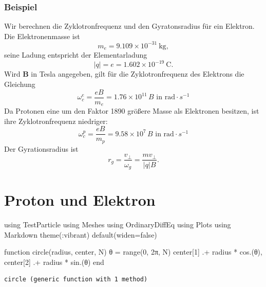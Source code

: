 \documentclass[
  a4paper,
  DIV=11]{scrreprt}
\newenvironment{Shaded}{\begin{snugshade}}{\end{snugshade}}
\newcommand{\BuiltInTok}[1]{\textcolor[rgb]{0.00,0.23,0.31}{#1}}
\newcommand{\ConstantTok}[1]{\textcolor[rgb]{0.56,0.35,0.01}{#1}}
\newcommand{\FloatTok}[1]{\textcolor[rgb]{0.68,0.00,0.00}{#1}}
\newcommand{\FunctionTok}[1]{\textcolor[rgb]{0.28,0.35,0.67}{#1}}
\newcommand{\ImportTok}[1]{\textcolor[rgb]{0.00,0.46,0.62}{#1}}
\newcommand{\KeywordTok}[1]{\textcolor[rgb]{0.00,0.23,0.31}{#1}}
\newcommand{\NormalTok}[1]{\textcolor[rgb]{0.00,0.23,0.31}{#1}}
\newcommand{\OperatorTok}[1]{\textcolor[rgb]{0.37,0.37,0.37}{#1}}
\begin{document}
\hypertarget{beispiel-1}{%
\subsection{Beispiel}\label{beispiel-1}}

Wir berechnen die Zyklotronfrequenz und den Gyratonsradius für ein
Elektron. Die Elektronenmasse ist \[
m_e = 9.109 \times 10^{-31} ~\text{kg},
\] seine Ladung entspricht der Elementarladung \[
|q| = e = 1.602 \times 10^{-19} ~ \text{C}.
\] Wird \(\mathbf B\) in Tesla angegeben, gilt für die Zyklotronfrequenz
des Elektrons die Gleichung \[
\omega_c^e = \frac{e B}{m_e} = 1.76 \times 10^{11} \, B \text{ in rad}\cdot s^{-1}
\] Da Protonen eine um den Faktor 1890 größere Masse als Elektronen
besitzen, ist ihre Zyklotronfrequenz niedriger: \[
\omega_c^p = \frac{e B}{m_p} = 9.58 \times 10^{7} \, B \text{ in rad}\cdot s^{-1}
\] Der Gyrationsradius ist \[
r_g = \frac{v_\perp}{\omega_g} = \frac{m v_\perp}{|q| B}.
\]

\hypertarget{proton-und-elektron}{%
\chapter{Proton und Elektron}\label{proton-und-elektron}}

\begin{Shaded}
\begin{Highlighting}[]
\ImportTok{using} \BuiltInTok{TestParticle}
\ImportTok{using} \BuiltInTok{Meshes}
\ImportTok{using} \BuiltInTok{OrdinaryDiffEq}
\ImportTok{using} \BuiltInTok{Plots}
\ImportTok{using} \BuiltInTok{Markdown}
\FunctionTok{theme}\NormalTok{(}\OperatorTok{:}\NormalTok{vibrant)}
\FunctionTok{default}\NormalTok{(widen}\OperatorTok{=}\ConstantTok{false}\NormalTok{)}

\KeywordTok{function} \FunctionTok{circle}\NormalTok{(radius, center, N)}
\NormalTok{    θ }\OperatorTok{=} \FunctionTok{range}\NormalTok{(}\FloatTok{0}\NormalTok{, }\FloatTok{2}\NormalTok{π, N)}
\NormalTok{    center[}\FloatTok{1}\NormalTok{] }\OperatorTok{.+}\NormalTok{ radius }\OperatorTok{*} \FunctionTok{cos}\NormalTok{.(θ), center[}\FloatTok{2}\NormalTok{] }\OperatorTok{.+}\NormalTok{ radius }\OperatorTok{*} \FunctionTok{sin}\NormalTok{.(θ)}
\KeywordTok{end}
\end{Highlighting}
\end{Shaded}

\begin{verbatim}
circle (generic function with 1 method)
\end{verbatim}
\end{document}
